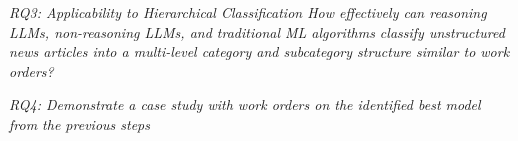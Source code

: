 \bigskip
\textit{RQ3: Applicability to Hierarchical Classification
\newline
How effectively can reasoning LLMs, non-reasoning LLMs, and traditional ML algorithms classify unstructured news articles into a multi-level category and subcategory structure similar to work orders?}

\bigskip
\textit{RQ4: Demonstrate a case study with work orders on the identified best model from the previous steps} %



